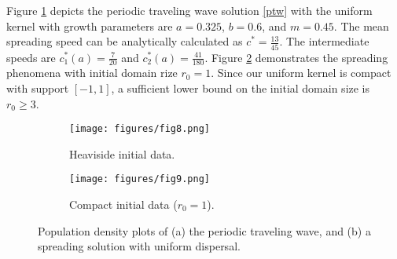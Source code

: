 \documentclass[11pt]{article}
\theoremstyle{definition}
\numberwithin{equation}{section}
\numberwithin{thm}{section}
\renewcommand{\a}{a}
\renewcommand{\b}{b}
\newcommand{\m}{m}
\begin{document}
Figure \ref{fig:subim3} depicts the periodic traveling wave solution \eqref{ptw} with the uniform kernel with growth parameters are $\a=0.325$, $\b=0.6$, and $\m=0.45$.
The mean spreading speed can be analytically calculated as $c^*=\frac{13}{45}$.
The intermediate speeds are $c_1^*(\a)=\frac{7}{20}$ and $c_2^*(\a)=\frac{41}{180}$.
Figure \ref{fig:subim4} demonstrates the spreading phenomena with initial domain rize $r_0=1$.
Since our uniform kernel is compact with support $[-1,1]$, a sufficient lower bound on the initial domain size is $r_0 \geq 3$.

\begin{figure}[h]
\begin{subfigure}{0.5\textwidth}
\texttt{[image: figures/fig8.png]}
\caption{Heaviside initial data.}
\label{fig:subim3}
\end{subfigure}
\begin{subfigure}{0.5\textwidth}
\texttt{[image: figures/fig9.png]}
\caption{Compact initial data ($r_0=1$).}
\label{fig:subim4}
\end{subfigure}
\caption{Population density plots of (a) the periodic traveling wave, and (b) a spreading solution with uniform dispersal.}
\label{fig:uniformplot}
\end{figure}
\end{document}
